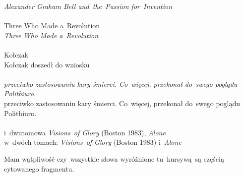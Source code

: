 \documentclass[a4paper,11pt]{article}
\begin{document}
\Pow  \emph{Alexander Graham Bell and~the~Passion for~Invention} \\
 \\
\Jest Three Who Made a~Revolution \\
\Pow  \emph{Three Who Made a~Revolution} \\
 \\
\Jest Kołczak \\
\Pow  Kołczak doszedł do wniosku \\
 \\
\Jest \emph{przeciwko zastosowaniu kary śmierci. Co~więcej,
  przekonał do~swego poglądu Politbiuro.} \\
\Pow przeciwko zastosowaniu kary śmierci. Co~więcej, przekonał
do~swego poglądu Politbiuro. \\
 \\
\Jest i~dwutomowa \emph{Visions~of Glory} (Boston 1983), \emph{Alone} \\
\Pow w~dwóch tomach: \emph{Visions~of Glory} (Boston 1983)
i~\emph{Alone} \\

\vspace{\spaceTwo}








\start {} Mam wątpliwość czy~wszystkie słowa wyróżnione
tu~kursywą~są częścią cytowanego fragmentu.

\end{document}
